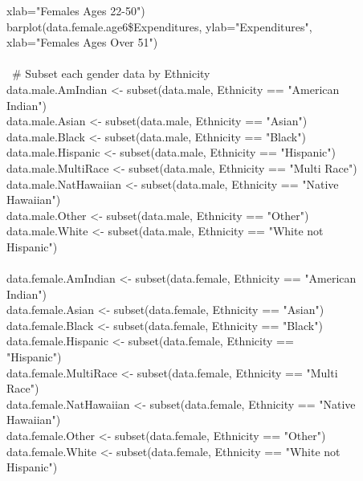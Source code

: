 \documentclass[12pt,letterpaper]{article}
\begin{document}
{		\indent xlab="Females Ages 22-50")\\
		barplot(data.female.age6\$Expenditures, ylab="Expenditures",\\
		\indent xlab="Females Ages Over 51")\\
		\\ \
		\# Subset each gender data by Ethnicity\\
		data.male.AmIndian <- subset(data.male, Ethnicity == "American\\
		\indent Indian")\\
		data.male.Asian <- subset(data.male, Ethnicity == "Asian")\\
		data.male.Black <- subset(data.male, Ethnicity == "Black")\\
		data.male.Hispanic <- subset(data.male, Ethnicity == "Hispanic")\\
		data.male.MultiRace <- subset(data.male, Ethnicity == "Multi Race")\\
		data.male.NatHawaiian <- subset(data.male, Ethnicity == "Native\\
		\indent Hawaiian")\\
		data.male.Other <- subset(data.male, Ethnicity == "Other")\\
		data.male.White <- subset(data.male, Ethnicity == "White not\\
		\indent Hispanic")\\
		\ \\
		data.female.AmIndian <- subset(data.female, Ethnicity == "American\\
		\indent Indian")\\
		data.female.Asian <- subset(data.female, Ethnicity == "Asian")\\
		data.female.Black <- subset(data.female, Ethnicity == "Black")\\
		data.female.Hispanic <- subset(data.female, Ethnicity ==\\
		\indent "Hispanic")\\
		data.female.MultiRace <- subset(data.female, Ethnicity == "Multi\\
		\indent Race")\\
		data.female.NatHawaiian <- subset(data.female, Ethnicity == "Native\\
		\indent Hawaiian")\\
		data.female.Other <- subset(data.female, Ethnicity == "Other")\\
		data.female.White <- subset(data.female, Ethnicity == "White not\\
		\indent Hispanic")\\
}
\end{document}
